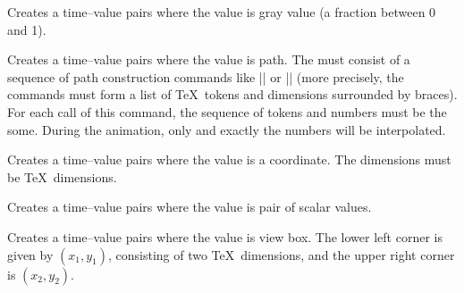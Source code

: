 \begin{command}{\pgfsysanimvalcolorgray{}}
\end{command}
\begin{command}{\pgfsys@animation@val@color@gray{}}
    Creates a time--value pairs where the value is gray value (a
    fraction between 0 and 1).
\end{command}

\begin{command}{\pgfsysanimvalpath{}}
\end{command}
\begin{command}{\pgfsys@animation@val@path{}}
    Creates a time--value pairs where the value is path. The  must consist of a sequence of path construction commands like
    |\pgfsys@lineto| or |\pgfsyssoftpath@linetotoken| (more precisely, the
    commands must form a list of \TeX\ tokens and dimensions surrounded by
    braces). For each call of this command, the sequence of tokens and numbers
    must be the some. During the animation, only and exactly the numbers will
    be interpolated.
\end{command}

\begin{command}{\pgfsysanimvaltranslate{}}
\end{command}
\begin{command}{\pgfsys@animation@val@translate{}}
    Creates a time--value pairs where the value is a coordinate. The dimensions
    must be \TeX\ dimensions.
\end{command}

\begin{command}{\pgfsysanimvalscale{}}
\end{command}
\begin{command}{\pgfsys@animation@val@scale{}}
    Creates a time--value pairs where the value is pair of scalar values.
\end{command}

\begin{command}{\pgfsysanimvalviewbox{}}
\end{command}
\begin{command}{\pgfsys@animation@val@viewbox{}}
    Creates a time--value pairs where the value is view box. The lower left
    corner is given by $(x_1,y_1)$, consisting of two \TeX\ dimensions, and the
    upper right corner is $(x_2,y_2)$.
\end{command}

